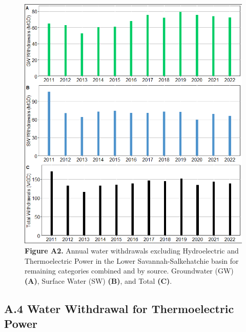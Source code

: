 \documentclass[
]{article}
\begin{document}
\begin{figure}[H]

{\centering \includegraphics{LSS_figures/trend-bar-plot-all_cat_nopower-1} 

}

\caption{\textbf{Figure A2.} Annual water withdrawals excluding Hydroelectric and Thermoelectric Power in the Lower Savannah-Salkehatchie basin for remaining categories combined and by source. Groundwater (GW) \textbf{(A)}, Surface Water (SW) \textbf{(B)}, and Total \textbf {(C)}.}\label{fig:trend-bar-plot-all_cat_nopower}
\end{figure}

\hypertarget{a.4-water-withdrawal-for-thermoelectric-power}{%
\subsection{A.4 Water Withdrawal for Thermoelectric
Power}\label{a.4-water-withdrawal-for-thermoelectric-power}}
\end{document}
